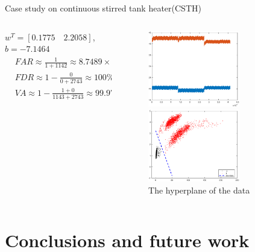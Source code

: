 \documentclass[10pt]{beamer}
\begin{document}
\begin{frame}{Case study on continuous stirred tank heater(CSTH)}
     \begin{columns}
             \begin{column}{0.5\textwidth}
 $w^T = [0.1775 \quad 2.2058]$,$b = -7.1464$
\begin{equation} \nonumber
  \begin{aligned}
   & FAR \approx \frac{1}{1+1142} \approx  8.7489\times 10^{-2} \% \\
   & FDR \approx 1 - \frac{0}{0+2743} \approx 100 \% \\
   & VA \approx 1 - \frac{1+0}{1143+2743} \approx 99.97 \% 
  \end{aligned}
\end{equation}
           \end{column}
        \begin{column}{0.5\textwidth}  %
   \begin{figure}
        \centering
        \includegraphics[width=4cm]{fig/csthrealdata.eps}
        \caption{real data from CSTH}
        \includegraphics[width=4cm]{fig/Csthboundary.eps}
        \caption{The hyperplane of the data}
        \end{figure}
  
        \end{column}
    \end{columns}
\end{frame}
\section{Conclusions and future work}
\end{document}
